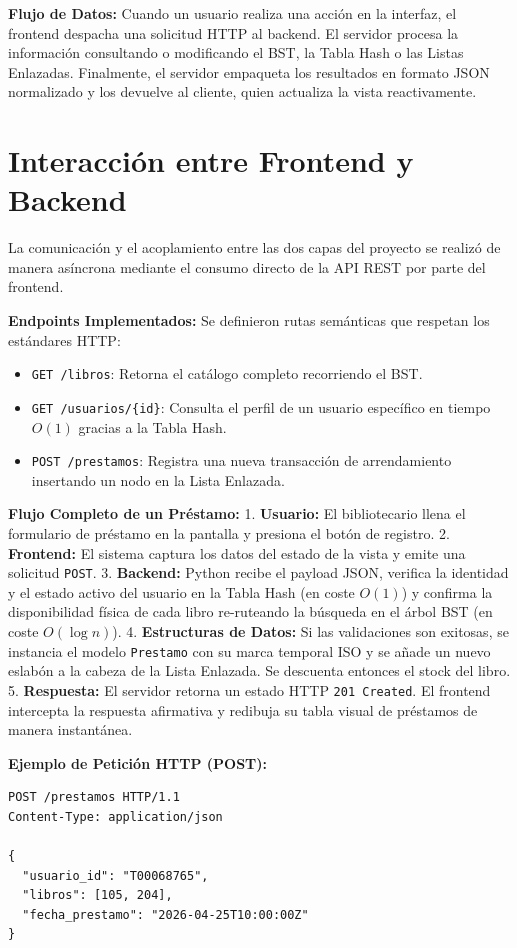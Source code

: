 \documentclass{rapport}
\begin{document}
\textbf{Flujo de Datos:} Cuando un usuario realiza una acción en la interfaz, el frontend despacha una solicitud HTTP al backend. El servidor procesa la información consultando o modificando el BST, la Tabla Hash o las Listas Enlazadas. Finalmente, el servidor empaqueta los resultados en formato JSON normalizado y los devuelve al cliente, quien actualiza la vista reactivamente.

\section{Interacción entre Frontend y Backend}

La comunicación y el acoplamiento entre las dos capas del proyecto se realizó de manera asíncrona mediante el consumo directo de la API REST por parte del frontend.

\textbf{Endpoints Implementados:} Se definieron rutas semánticas que respetan los estándares HTTP:
\begin{itemize}
    \item \texttt{GET /libros}: Retorna el catálogo completo recorriendo el BST.
    \item \texttt{GET /usuarios/\{id\}}: Consulta el perfil de un usuario específico en tiempo $O(1)$ gracias a la Tabla Hash.
    \item \texttt{POST /prestamos}: Registra una nueva transacción de arrendamiento insertando un nodo en la Lista Enlazada.
\end{itemize}

\textbf{Flujo Completo de un Préstamo:} 
1. \textbf{Usuario:} El bibliotecario llena el formulario de préstamo en la pantalla y presiona el botón de registro.
2. \textbf{Frontend:} El sistema captura los datos del estado de la vista y emite una solicitud \texttt{POST}.
3. \textbf{Backend:} Python recibe el payload JSON, verifica la identidad y el estado activo del usuario en la Tabla Hash (en coste $O(1)$) y confirma la disponibilidad física de cada libro re-ruteando la búsqueda en el árbol BST (en coste $O(\log n)$).
4. \textbf{Estructuras de Datos:} Si las validaciones son exitosas, se instancia el modelo \texttt{Prestamo} con su marca temporal ISO y se añade un nuevo eslabón a la cabeza de la Lista Enlazada. Se descuenta entonces el stock del libro.
5. \textbf{Respuesta:} El servidor retorna un estado HTTP \texttt{201 Created}. El frontend intercepta la respuesta afirmativa y redibuja su tabla visual de préstamos de manera instantánea.

\textbf{Ejemplo de Petición HTTP (POST):}
\begin{verbatim}
POST /prestamos HTTP/1.1
Content-Type: application/json

{
  "usuario_id": "T00068765",
  "libros": [105, 204],
  "fecha_prestamo": "2026-04-25T10:00:00Z"
}
\end{verbatim}
\end{document}
